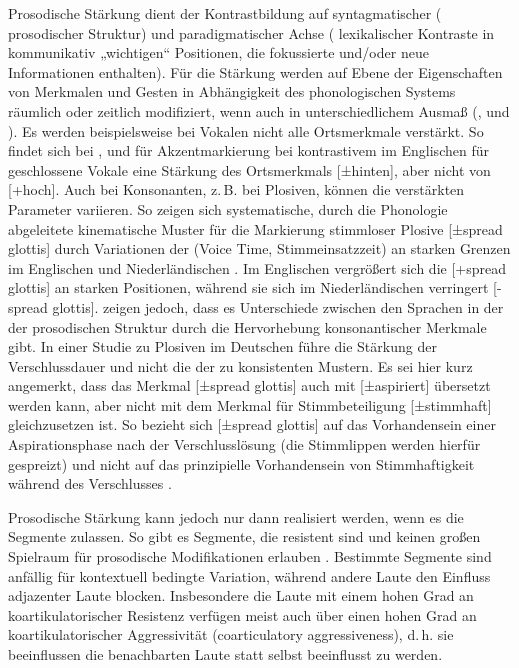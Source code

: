 Prosodische Stärkung dient der Kontrastbildung auf syntagmatischer ( prosodischer Struktur) und paradigmatischer Achse ( lexikalischer Kontraste in kommunikativ „wichtigen“ Positionen, die fokussierte und/oder neue Informationen enthalten). Für die Stärkung werden auf Ebene der  Eigenschaften von Merkmalen und Gesten in Abhängigkeit des phonologischen Systems räumlich oder zeitlich modifiziert, wenn auch in unterschiedlichem Ausmaß (\citet[][3867]{Cho2005a}, \citet{Cho2005b} und \citet[][521]{Cho2006}). Es werden beispielsweise bei Vokalen nicht alle Ortsmerkmale verstärkt. So findet sich bei \citet{DeJong1993}, \citet{Harrington2000} und \citet{Cho2005a} für Akzentmarkierung bei kontrastivem  im Englischen für geschlossene Vokale eine Stärkung des Ortsmerkmals [±hinten], aber nicht von [+hoch]. Auch bei Konsonanten, z.\,B. bei Plosiven, können die verstärkten Parameter variieren. So zeigen sich systematische, durch die Phonologie abgeleitete kinematische Muster für die Markierung stimmloser Plosive [±spread glottis] durch Variationen der  (Voice  Time, Stimmeinsatzzeit) an  starken Grenzen im Englischen und Niederländischen \citep{Cho2005b}. Im Englischen vergrößert sich die  [+spread glottis] an  starken Positionen, während sie sich im Niederländischen verringert [-spread glottis]. \citet{Kuzla2007} zeigen jedoch, dass es Unterschiede zwischen den Sprachen in der  der prosodischen Struktur durch die Hervorhebung konsonantischer Merkmale gibt. In einer Studie zu Plosiven im Deutschen führe die Stärkung der Verschlussdauer und nicht die der  zu konsistenten Mustern. Es sei hier kurz angemerkt, dass das Merkmal [±spread glottis] auch mit [±aspiriert] übersetzt werden kann, aber nicht mit dem Merkmal für Stimmbeteiligung [±stimmhaft] gleichzusetzen ist. So bezieht sich [±spread glottis] auf das Vorhandensein einer Aspirationsphase nach der Verschlusslösung (die Stimmlippen werden hierfür gespreizt) und nicht auf das prinzipielle Vorhandensein von Stimmhaftigkeit während des Verschlusses \citep[vgl.][]{Hall2011}.

Prosodische Stärkung kann jedoch nur dann realisiert werden, wenn es die Segmente zulassen. So gibt es Segmente, die  resistent sind und keinen großen Spielraum für prosodische Modifikationen erlauben \citep[coarticulatory resistance, vgl.][]{Hardcastle1999, Tabain2001, Recasens2009, Iskarous2010}. Bestimmte Segmente sind anfällig für kontextuell bedingte Variation, während andere Laute den Einfluss adjazenter Laute blocken. Insbesondere die Laute mit einem hohen Grad an koartikulatorischer Resistenz verfügen meist auch über einen hohen Grad an koartikulatorischer Aggressivität (coarticulatory aggressiveness), d.\,h. sie beeinflussen die benachbarten Laute statt selbst beeinflusst zu werden. 

